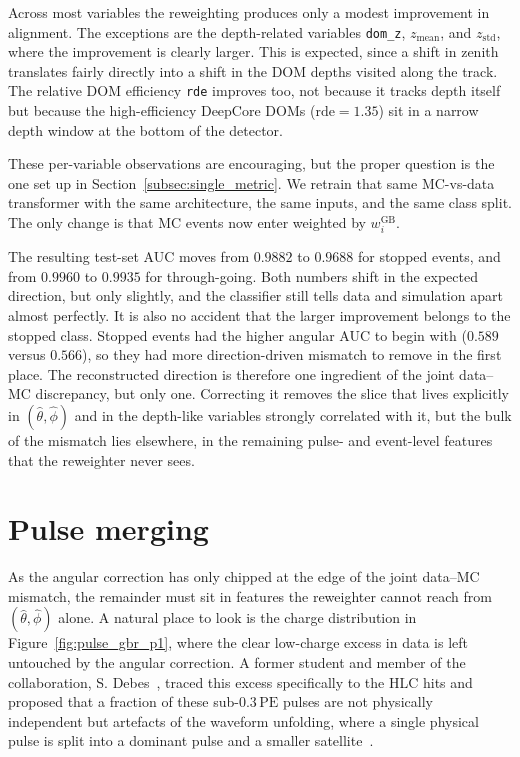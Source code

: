 Across most variables the reweighting produces only a modest improvement in alignment. The exceptions are the depth-related variables \texttt{dom\_z}, $z_{\mathrm{mean}}$, and $z_{\mathrm{std}}$, where the improvement is clearly larger. This is expected, since a shift in zenith translates fairly directly into a shift in the DOM depths visited along the track. The relative DOM efficiency \texttt{rde} improves too, not because it tracks depth itself but because the high-efficiency DeepCore DOMs ($\mathrm{rde}=1.35$) sit in a narrow depth window at the bottom of the detector.

These per-variable observations are encouraging, but the proper question is the one set up in Section~\ref{subsec:single_metric}. We retrain that same MC-vs-data transformer with the same architecture, the same inputs, and the same class split. The only change is that MC events now enter weighted by $w_i^{\mathrm{GB}}$.

The resulting test-set AUC moves from $0.9882$ to $0.9688$ for stopped events, and from $0.9960$ to $0.9935$ for through-going. Both numbers shift in the expected direction, but only slightly, and the classifier still tells data and simulation apart almost perfectly. It is also no accident that the larger improvement belongs to the stopped class. Stopped events had the higher angular AUC to begin with ($0.589$ versus $0.566$), so they had more direction-driven mismatch to remove in the first place. The reconstructed direction is therefore one ingredient of the joint data--MC discrepancy, but only one. Correcting it removes the slice that lives explicitly in $(\hat\theta,\hat\phi)$ and in the depth-like variables strongly correlated with it, but the bulk of the mismatch lies elsewhere, in the remaining pulse- and event-level features that the reweighter never sees.


\section{Pulse merging}
\label{sec:pulse_merging}

As the angular correction has only chipped at the edge of the joint
data--MC mismatch, the remainder must sit in features the reweighter
cannot reach from $(\hat\theta,\hat\phi)$ alone. A natural place to look
is the charge distribution in Figure~\ref{fig:pulse_gbr_p1}, where
the clear low-charge excess in data is left untouched by the angular
correction. A former student and member of the collaboration, S. Debes~\cite{simon}, traced
this excess specifically to the HLC hits and proposed that a fraction
of these sub-$0.3\,\mathrm{PE}$ pulses are not physically independent
but artefacts of the waveform unfolding, where a single physical pulse
is split into a dominant pulse and a smaller satellite~\cite{simon}.

